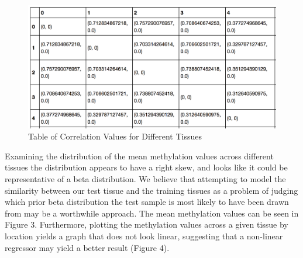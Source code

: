 \documentclass{article} %
\begin{document}
\begin{figure}[!ht]
\begin{center}
\caption{Table of Correlation Values for Different Tissues}
\begin{minipage}[b]{0.40\linewidth}
	\includegraphics[scale=0.3]{table1.png}
\end{minipage}
\end{center}
\end{figure}

Examining the distribution of the mean methylation values across different tissues the distribution appears to have a right skew, and looks like it could be representative of a beta distribution. We believe that attempting to model the similarity between our test tissue and the training tissues as a problem of judging which prior beta distribution the test sample is most likely to have been drawn from may be a worthwhile approach. The mean methylation values can be seen in Figure 3. Furthermore, plotting the methylation values across a given tissue by location yields a graph that does not look linear, suggesting that a non-linear regressor may yield a better result (Figure 4).
\end{document}
